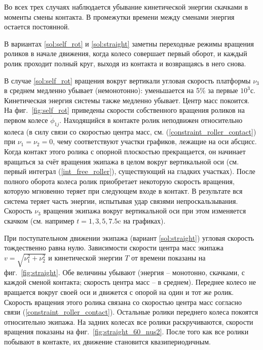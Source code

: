 Во всех трех случаях наблюдается убывание кинетической энергии скачками в моменты смены контакта. В промежутки времени между сменами энергия остается постоянной.

В вариантах \ref{sol:self_rot} и \ref{sol:straight} заметны переходные режимы вращения роликов в начале движения, когда колесо совершает первый оборот, и каждый ролик проходит полный круг, выходя из контакта и возвращаясь в него снова.

В случае \ref{sol:self_rot} вращения вокруг вертикали угловая скорость платформы $\nu_3$ в среднем медленно убывает (немонотонно): уменьшается на 5\%  за первые $10^3$с. Кинетическая энергия системы также медленно убывает. Центр масс покоится. На фиг.~\ref{fig:self_rot} приведены скорости собственного вращения роликов на первом колесе $\dot{\phi}_{1j}$. Находящийся в контакте ролик неподвижен относительно колеса (в силу связи со скоростью центра масс, см. (\ref{constraint_roller_contact}) при $\nu_1 = \nu_2 = 0$, чему соответствуют участки графиков, лежащие на оси абсцисс. Когда контакт этого ролика с опорной плоскостью прекращается, он начинает вращаться за счёт вращения экипажа в целом вокруг вертикальной оси (см. первый интеграл (\ref{int_free_roller}), существующий на гладких участках). После полного оборота колеса ролик приобретает некоторую скорость вращения, которую мгновенно теряет при следующем входе в контакт. В результате вся система теряет часть энергии, испытывая удар связями непроскальзывания. Скорость $\nu_3$ вращения экипажа вокруг вертикальной оси при этом изменяется скачком (см. например $t=1, 3, 5, 7.5$c на графиках).

При поступательном движении экипажа (вариант \ref{sol:straight}) угловая скорость тождественно равна нулю. Зависимости скорости центра масс экипажа $v = \sqrt{\nu_1^2+\nu_2^2}$ и кинетической энергии $T$ от времени показаны на фиг.~\ref{fig:straight}. Обе величины убывают (энергия -- монотонно, скачками, с каждой сменой контакта; скорость центра масс -- в среднем). Переднее колесо не вращается вокруг своей оси и движется с опорой на один и тот же ролик. Скорость вращения этого ролика связана со скоростью центра масс согласно связи (\ref{constraint_roller_contact}). Остальные ролики переднего колеса покоятся относительно экипажа. На задних колесах все ролики раскручиваются, скорости вращения показаны на фиг.~\ref{fig:straight_60_nus2}. После того как все ролики побывают в контакте, их движение становится квазипериодичным.

